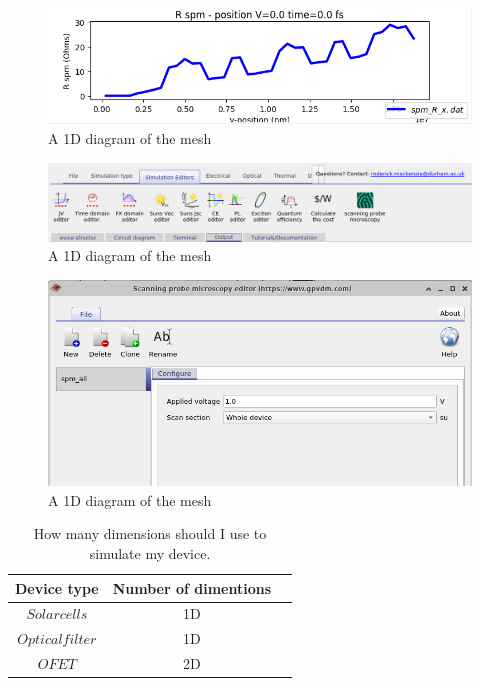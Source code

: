 \begin{figure}[H]
\centering
\includegraphics[width=\textwidth]{./images/la_5.png}
\caption{A 1D diagram of the mesh}
\label{fig:emeshdiagram}
\end{figure}

\begin{figure}[H]
\centering
\includegraphics[width=\textwidth]{./images/la_6.png}
\caption{A 1D diagram of the mesh}
\label{fig:emeshdiagram}
\end{figure}

\begin{figure}[H]
\centering
\includegraphics[width=\textwidth]{./images/la_7.png}
\caption{A 1D diagram of the mesh}
\label{fig:emeshdiagram}
\end{figure}


\begin{table}[H]
\begin{center}
\begin{tabular}{ |c|c|c| } 
 \hline
	Device type			& 	Number of dimentions  \\ 
 \hline
	$Solar cells$ 		&	1D \\ 
	$Optical filter$	&	1D\\ 
	$OFET$ 				&	2D\\ 
 \hline
\end{tabular}
\caption{How many dimensions should I use to simulate my device.}
\end{center}
\end{table}

